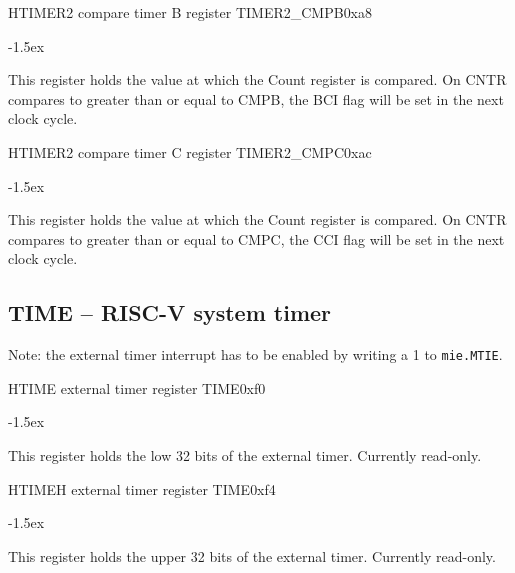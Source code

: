 \documentclass[12pt]{article}
\begin{document}
\begin{register}{H}{TIMER2 compare timer B register TIMER2\_CMPB}{0xa8}
\label{timer2cmpb}
%
%
\regnewline%
\end{register}
\begin{regdesc}[0.8\textwidth]\begin{reglist}[0000]
\itemsep-1.5ex
\item[CMPB] This register holds the value at which the Count register is compared. On CNTR compares to greater than or equal to CMPB, the BCI flag will be set in the next clock cycle.
\end{reglist}\end{regdesc}

\begin{register}{H}{TIMER2 compare timer C register TIMER2\_CMPC}{0xac}
\label{timer2cmpc}
%
%
\regnewline%
\end{register}
\begin{regdesc}[0.8\textwidth]\begin{reglist}[0000]
\itemsep-1.5ex
\item[CMPC] This register holds the value at which the Count register is compared. On CNTR compares to greater than or equal to CMPC, the CCI flag will be set in the next clock cycle.
\end{reglist}\end{regdesc}

\subsection{TIME -- RISC-V system timer}
Note: the external timer interrupt has to be enabled by writing a 1 to \lstinline|mie.MTIE|.\\
\begin{register}{H}{TIME external timer register TIME}{0xf0}
\label{time}
%
\regnewline%
\end{register}
\begin{regdesc}[0.8\textwidth]\begin{reglist}[0000]
\itemsep-1.5ex
\item This register holds the low 32 bits of the external timer. Currently read-only.
\end{reglist}\end{regdesc}

\begin{register}{H}{TIMEH external timer register TIME}{0xf4}
\label{timeh}
%
\regnewline%
\end{register}
\begin{regdesc}[0.8\textwidth]\begin{reglist}[0000]
\itemsep-1.5ex
\item This register holds the upper 32 bits of the external timer. Currently read-only.
\end{reglist}\end{regdesc}
\end{document}
